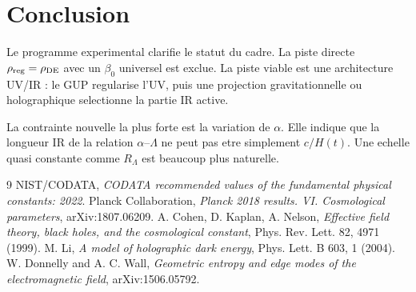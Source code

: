 \documentclass[11pt,a4paper]{article}
\newcommand{\rhoDE}{\rho_{\rm DE}}
\begin{document}
\section{Conclusion}

Le programme experimental clarifie le statut du cadre. La piste directe
\(\rho_{\rm reg}=\rhoDE\) avec un \(\beta_0\) universel est exclue. La piste
viable est une architecture UV/IR : le GUP regularise l'UV, puis une projection
gravitationnelle ou holographique selectionne la partie IR active.

La contrainte nouvelle la plus forte est la variation de \(\alpha\). Elle
indique que la longueur IR de la relation \(\alpha\)--\(\Lambda\) ne peut pas
etre simplement \(c/H(t)\). Une echelle quasi constante comme \(R_\Lambda\) est
beaucoup plus naturelle.

\begin{thebibliography}{9}
NIST/CODATA, \emph{CODATA recommended values of the fundamental physical
constants: 2022}.
Planck Collaboration, \emph{Planck 2018 results. VI. Cosmological parameters},
arXiv:1807.06209.
A. Cohen, D. Kaplan, A. Nelson, \emph{Effective field theory, black holes, and
the cosmological constant}, Phys. Rev. Lett. 82, 4971 (1999).
M. Li, \emph{A model of holographic dark energy}, Phys. Lett. B 603, 1 (2004).
W. Donnelly and A. C. Wall, \emph{Geometric entropy and edge modes of the
electromagnetic field}, arXiv:1506.05792.
\end{thebibliography}
\end{document}
